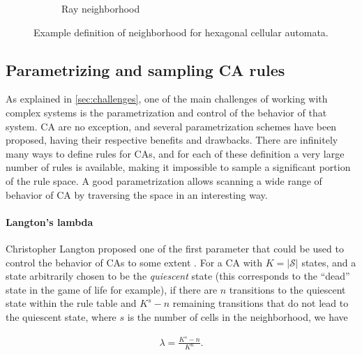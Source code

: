 \begin{figure}[htbp]
\begin{subfigure}[b]{.35\linewidth}
    \caption{Ray neighborhood}
    \label{fig:hexagonal_2}
  \end{subfigure}
  \caption{Example definition of neighborhood for hexagonal cellular automata.}
\label{fig:hexagonal}
\end{figure}


\subsection{Parametrizing and sampling CA rules}
As explained in \ref{sec:challenges}, one of the main challenges of working with
complex systems is the parametrization and control of the behavior of that
system. \ac{CA} are no exception, and several parametrization schemes have been
proposed, having their respective benefits and drawbacks. There are infinitely
many ways to define rules for \acp{CA}, and for each of these definition a very
large number of rules is available, making it impossible to sample a significant
portion of the rule space. A good parametrization allows scanning a wide range
of behavior of \ac{CA} by traversing the space in an interesting way.

\paragraph{Langton's lambda\label{sec:langtons-lambda}}

Christopher Langton proposed one of the first parameter that could be used to
control the behavior of \acp{CA} to some extent
\parencite{langtonStudyingArtificialLife1986, langtonComputationEdgeChaos1990}.
For a \ac{CA} with $K = |\mathcal{S}|$ states, and a state arbitrarily chosen to be
the \emph{quiescent} state (this corresponds to the ``dead'' state in the game
of life for example), if there are $n$ transitions to the quiescent state within
the rule table and $K^{s} - n$ remaining transitions that do not lead to the
quiescent state, where $s$ is the number of cells in the neighborhood, we
have

\begin{equation}
  \label{eq:langton}
  \begin{aligned}
    \lambda = \frac{K^{s} - n}{K^{n}}.
  \end{aligned}
\end{equation}

